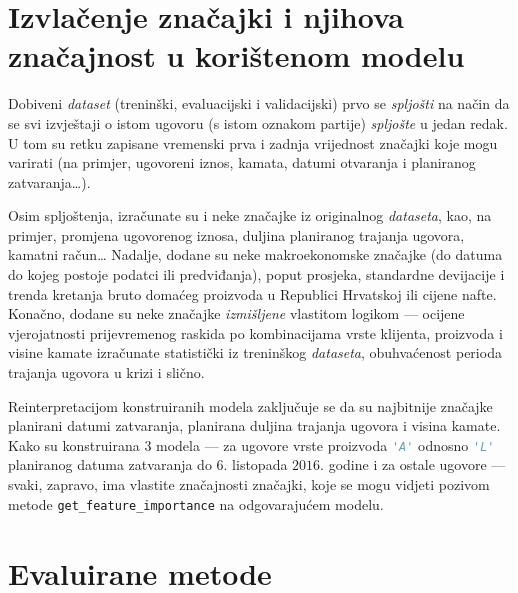 \documentclass[paper = a4, fontsize = 11pt, DIV = 12, BCOR = 0pt, headings = standardclasses, numbers = endperiod]{scrartcl}
\begin{document}
	\par

	\section{Izvlačenje značajki i njihova značajnost u korištenom modelu}
	\label{sec:izvlacenje_znacajki}

	Dobiveni \emph{dataset} (treninški, evaluacijski i validacijski) prvo se \emph{spljošti} na način da se svi izvještaji o istom ugovoru (s istom oznakom partije) \emph{spljošte} u jedan redak. U tom su retku zapisane vremenski prva i zadnja vrijednost značajki koje mogu varirati (na primjer, ugovoreni iznos, kamata, datumi otvaranja i planiranog zatvaranja{\ldots}).

	\par

	Osim spljoštenja, izračunate su i neke značajke iz originalnog \emph{dataseta}, kao, na primjer, promjena ugovorenog iznosa, duljina planiranog trajanja ugovora, kamatni račun{\ldots} Nadalje, dodane su neke makroekonomske značajke (do datuma do kojeg postoje podatci ili predviđanja), poput prosjeka, standardne devijacije i trenda kretanja bruto domaćeg proizvoda u Republici Hrvatskoj ili cijene nafte. Konačno, dodane su neke značajke \emph{izmišljene} vlastitom logikom --- ocijene vjerojatnosti prijevremenog raskida po kombinacijama vrste klijenta, proizvoda i visine kamate izračunate statistički iz treninškog \emph{dataseta}, obuhvaćenost perioda trajanja ugovora u krizi i slično.

	\par

	Reinterpretacijom konstruiranih modela zaključuje se da su najbitnije značajke planirani datumi zatvaranja, planirana duljina trajanja ugovora i visina kamate. Kako su konstruirana $ 3 $ modela --- za ugovore vrste proizvoda \lstinline[language = Python, style = lijepo]{'A'} odnosno \lstinline[language = Python, style = lijepo]{'L'} planiranog datuma zatvaranja do $ 6 $. listopada $ 2016 $. godine i za ostale ugovore --- svaki, zapravo, ima vlastite značajnosti značajki, koje se mogu vidjeti pozivom metode \lstinline[language = Python, style = lijepo]{get_feature_importance} na odgovarajućem modelu.

	\par

	\section{Evaluirane metode}
	\label{sec:evaluirane_metode}
\end{document}
